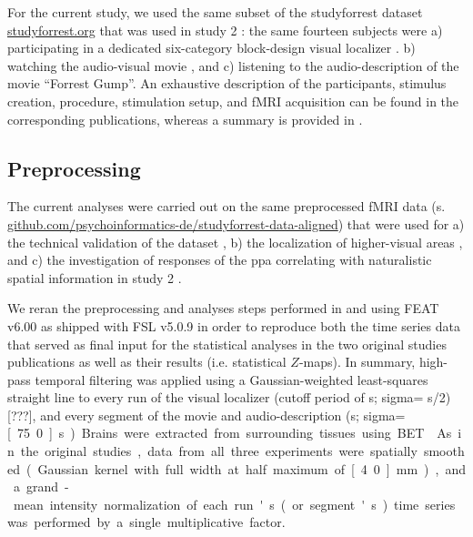 
For the current study, we used the same subset of the studyforrest dataset
\href{http://www.studyforrest.org}{studyforrest.org} that was used in study 2
\citep{haeusler2022processing}:
%
the same fourteen subjects were
a) participating in a dedicated six-category block-design visual localizer
\citep{sengupta2016extension}.
b) watching the audio-visual movie \citep{hanke2016simultaneous}, and
c) listening to the audio-description \citep{hanke2014audiomovie} of the movie
``Forrest Gump''.
An exhaustive description of the participants, stimulus creation, procedure,
stimulation setup, and fMRI acquisition can be found in the corresponding
publications, whereas a summary is provided in \citep{haeusler2022processing}.


\subsection{Preprocessing}

The current analyses were carried out on the same preprocessed fMRI data (s.
\href{https://github.com/psychoinformatics-de/studyforrest-data-aligned
}{\url{github.com/psychoinformatics-de/studyforrest-data-aligned}}) that were
used for
%
a) the technical validation of the dataset \citep{hanke2016simultaneous},
%
b) the localization of higher-visual areas \citep{sengupta2016extension}, and
%
c) the investigation of responses of the \ac{ppa} correlating with naturalistic
spatial information in study 2 \citep{haeusler2022processing}.

%
We reran the preprocessing and analyses steps performed in
\citet{sengupta2016extension} and \citet{haeusler2022processing} using FEAT
v6.00 \citep[FMRI Expert Analysis Tool;][]{woolrich2001autocorr} as shipped with
FSL v5.0.9 \citep[\href{https://www.fmrib.ox.ac.uk/fsl}{FMRIB's Software
Library;}][]{smith2004fsl} in order to reproduce both the time series data that
served as final input for the statistical analyses in the two original studies
publications as well as their results (i.e. statistical $Z$-maps).
In summary, high-pass temporal filtering was applied using a Gaussian-weighted
least-squares straight line to every run of the visual localizer (cutoff period
of \unit[100]{s}; sigma= \unit[100]{s}/2)[???], and every segment of the movie
and audio-description (\unit[150]{s}; sigma=\unit[75.0]{s}).
Brains were extracted from surrounding tissues using BET \citep{smith2002bet}.
As in the original studies, data from all three experiments were spatially
smoothed (Gaussian kernel with full width at half maximum of \unit[4.0]{mm}),
and a grand-mean intensity normalization of each run's (or segment's) time
series was performed by a single multiplicative factor.

